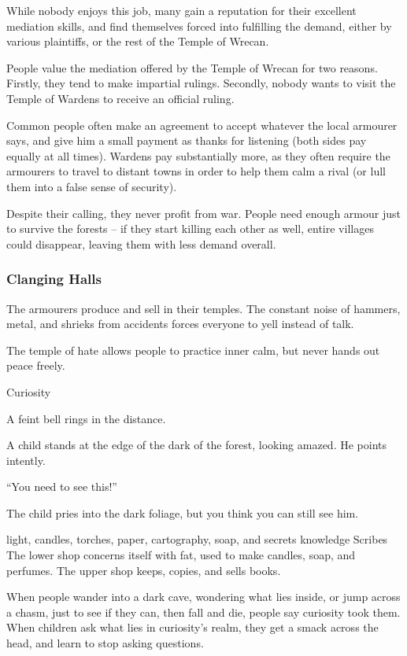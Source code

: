 \begin{multicols}{2}
\begin{description}
  While nobody enjoys this job, many gain a reputation for their excellent mediation skills, and find themselves forced into fulfilling the demand, either by various plaintiffs, or the rest of the Temple of Wrecan.
\end{description}

\noindent
People value the mediation offered by the Temple of Wrecan for two reasons.
Firstly, they tend to make impartial rulings.
Secondly, nobody wants to visit the Temple of Wardens to receive an official ruling.

Common people often make an agreement to accept whatever the local armourer says, and give him a small payment as thanks for listening (both sides pay equally at all times).
Wardens pay substantially more, as they often require the armourers to travel to distant towns in order to help them calm a rival (or lull them into a false sense of security).

Despite their calling, they never profit from war.
People need enough armour just to survive the forests -- if they start killing each other as well, entire villages could disappear, leaving them with less demand overall.

\subsubsection{Clanging Halls}
The armourers produce and sell in their temples.
The constant noise of hammers, metal, and shrieks from accidents forces everyone to yell instead of talk.

The temple of hate allows people to practice inner calm, but never hands out peace freely.

  {Curiosity}%
  {
    A feint bell rings in the distance.

    A child stands at the edge of the dark of the forest, looking amazed.
    He points intently.

    ``You need to see this!''

    The child pries into the dark foliage, but you think you can still see him.
  }%
  {light, candles, torches, paper, cartography, soap, and secrets}%
  {knowledge}%
  {Scribes}%
  {
    The lower shop concerns itself with fat, used to make candles, soap, and perfumes.
    The upper shop keeps, copies, and sells books.
  }%

When people wander into a dark cave, wondering what lies inside, or jump across a chasm, just to see if they can, then fall and die, people say curiosity took them.
When children ask what lies in curiosity's realm, they get a smack across the head, and learn to stop asking questions.


\end{multicols}
